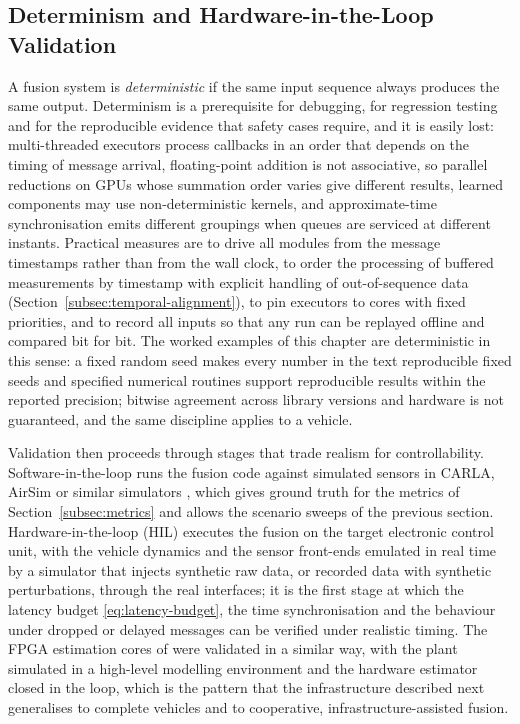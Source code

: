 \documentclass[graybox,envcountchap]{style/SNmono}
\providecommand{\DIFadd}[1]{{\protect\color{blue} #1}} %
\providecommand{\DIFdel}[1]{{\protect\color{red} #1}} %
\providecommand{\DIFaddbegin}{} %
\providecommand{\DIFaddend}{} %
\providecommand{\DIFdelbegin}{} %
\providecommand{\DIFdelend}{} %
\begin{document}
\subsection{Determinism and Hardware-in-the-Loop Validation}
\label{subsec:hil}

A fusion system is \emph{deterministic} if the same input sequence always produces the same output. Determinism is a prerequisite for debugging, for regression testing and for the reproducible evidence that safety cases require, and it is easily lost: multi-threaded executors process callbacks in an order that depends on the timing of message arrival, floating-point addition is not associative, so parallel reductions on GPUs whose summation order varies give different results, learned components may use non-deterministic kernels, and approximate-time synchronisation emits different groupings when queues are serviced at different instants. Practical measures are to drive all modules from the message timestamps rather than from the wall clock, to order the processing of buffered measurements by timestamp with explicit handling of out-of-sequence data (Section~\ref{subsec:temporal-alignment}), to pin executors to cores with fixed priorities, and to record all inputs so that any run can be replayed offline and compared bit for bit. The worked examples of this chapter are deterministic in this sense: \DIFdelbegin \DIFdel{a fixed random seed makes every number in the text reproducible }\DIFdelend \DIFaddbegin \DIFadd{fixed seeds and specified numerical routines support reproducible results within the reported precision; bitwise agreement across library versions and hardware is not guaranteed}\DIFaddend , and the same discipline applies to a vehicle.

Validation then proceeds through stages that trade realism for controllability. Software-in-the-loop runs the fusion code against simulated sensors in CARLA, AirSim or similar simulators \cite{dosovitskiy_carla_2017,shah_airsim_2017}, which gives ground truth for the metrics of Section~\ref{subsec:metrics} and allows the scenario sweeps of the previous section. Hardware-in-the-loop (HIL) executes the fusion on the target electronic control unit, with the vehicle dynamics and the sensor front-ends emulated in real time by a simulator that injects synthetic raw data, or recorded data with synthetic perturbations, through the real interfaces; it is the first stage at which the latency budget \eqref{eq:latency-budget}, the time synchronisation and the behaviour under dropped or delayed messages can be verified under realistic timing. The FPGA estimation cores of \cite{deliparaschos2016_jee_fpga} were validated in a similar way, with the plant simulated in a high-level modelling environment and the hardware estimator closed in the loop, which is the pattern that the infrastructure described next generalises to complete vehicles and to cooperative, infrastructure-assisted fusion.
\end{document}
